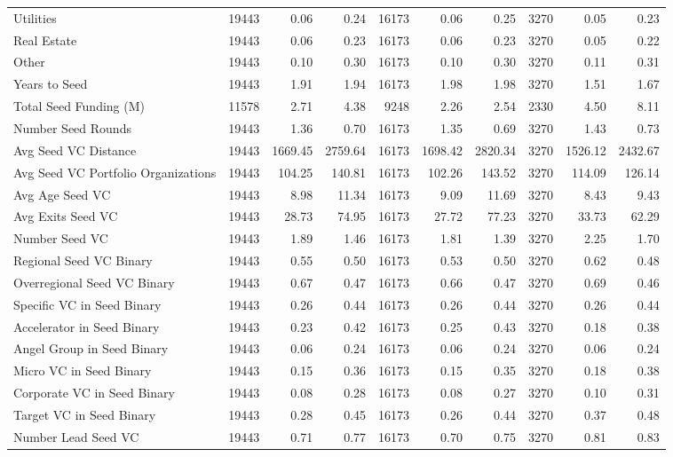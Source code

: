 \begin{table}[!h]
{\begin{tabular}[t]{lrrrrrrrrr}
Utilities & 19443 & 0.06 & 0.24 & 16173 & 0.06 & 0.25 & 3270 & 0.05 & 0.23\\
Real Estate & 19443 & 0.06 & 0.23 & 16173 & 0.06 & 0.23 & 3270 & 0.05 & 0.22\\
Other & 19443 & 0.10 & 0.30 & 16173 & 0.10 & 0.30 & 3270 & 0.11 & 0.31\\
Years to Seed & 19443 & 1.91 & 1.94 & 16173 & 1.98 & 1.98 & 3270 & 1.51 & 1.67\\
\addlinespace
Total Seed Funding (M) & 11578 & 2.71 & 4.38 & 9248 & 2.26 & 2.54 & 2330 & 4.50 & 8.11\\
Number Seed Rounds & 19443 & 1.36 & 0.70 & 16173 & 1.35 & 0.69 & 3270 & 1.43 & 0.73\\
Avg Seed VC Distance & 19443 & 1669.45 & 2759.64 & 16173 & 1698.42 & 2820.34 & 3270 & 1526.12 & 2432.67\\
Avg Seed VC Portfolio Organizations & 19443 & 104.25 & 140.81 & 16173 & 102.26 & 143.52 & 3270 & 114.09 & 126.14\\
Avg Age Seed VC & 19443 & 8.98 & 11.34 & 16173 & 9.09 & 11.69 & 3270 & 8.43 & 9.43\\
\addlinespace
Avg Exits Seed VC & 19443 & 28.73 & 74.95 & 16173 & 27.72 & 77.23 & 3270 & 33.73 & 62.29\\
Number Seed VC & 19443 & 1.89 & 1.46 & 16173 & 1.81 & 1.39 & 3270 & 2.25 & 1.70\\
Regional Seed VC Binary & 19443 & 0.55 & 0.50 & 16173 & 0.53 & 0.50 & 3270 & 0.62 & 0.48\\
Overregional Seed VC Binary & 19443 & 0.67 & 0.47 & 16173 & 0.66 & 0.47 & 3270 & 0.69 & 0.46\\
Specific VC in Seed Binary & 19443 & 0.26 & 0.44 & 16173 & 0.26 & 0.44 & 3270 & 0.26 & 0.44\\
\addlinespace
Accelerator in Seed Binary & 19443 & 0.23 & 0.42 & 16173 & 0.25 & 0.43 & 3270 & 0.18 & 0.38\\
Angel Group in Seed Binary & 19443 & 0.06 & 0.24 & 16173 & 0.06 & 0.24 & 3270 & 0.06 & 0.24\\
Micro VC in Seed Binary & 19443 & 0.15 & 0.36 & 16173 & 0.15 & 0.35 & 3270 & 0.18 & 0.38\\
Corporate VC in Seed Binary & 19443 & 0.08 & 0.28 & 16173 & 0.08 & 0.27 & 3270 & 0.10 & 0.31\\
Target VC in Seed Binary & 19443 & 0.28 & 0.45 & 16173 & 0.26 & 0.44 & 3270 & 0.37 & 0.48\\
\addlinespace
Number Lead Seed VC & 19443 & 0.71 & 0.77 & 16173 & 0.70 & 0.75 & 3270 & 0.81 & 0.83\\

\end{tabular}}
\end{table}
